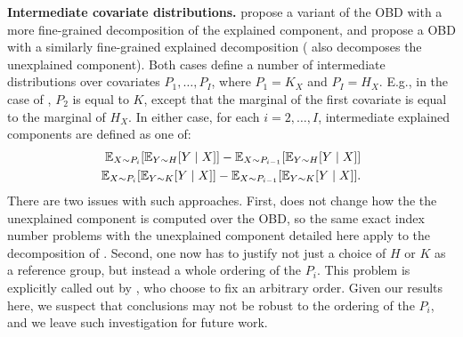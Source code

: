 \textbf{Intermediate covariate distributions.}
\citet{dinardoFortinLemieux1996} propose a variant of the OBD with a more fine-grained decomposition of the explained component, and \citet{quintero2025} propose a OBD with a similarly fine-grained explained decomposition (\citet{quintero2025} also decomposes the unexplained component).
Both cases define a number of intermediate distributions over covariates $P_1, \dots, P_I$, where $P_1 = K_X$ and $P_I = H_X$. E.g., in the case of \citet{quintero2025}, $P_2$ is equal to $K$, except that the marginal of the first covariate is equal to the marginal of $H_X$.
In either case, for each $i = 2, \dots, I$, intermediate explained components are defined as one of:
\begin{align}
  \mathbb{E}_{X \sim P_i}[ \mathbb{E}_{Y \sim H}[Y \mid X] ] - \mathbb{E}_{X \sim P_{i-1}} [ \mathbb{E}_{Y \sim H} [Y \mid X]] \\
  \mathbb{E}_{X \sim P_i}[ \mathbb{E}_{Y \sim K}[Y \mid X] ] - \mathbb{E}_{X \sim P_{i-1}} [ \mathbb{E}_{Y \sim K} [Y \mid X]].
\end{align}  
There are two issues with such approaches.
First, \citet{dinardoFortinLemieux1996} does not change how the the unexplained component is computed over the OBD, so the same exact index number problems with the unexplained component detailed here apply to the decomposition of \citet{dinardoFortinLemieux1996}.
Second, one now has to justify not just a choice of $H$ or $K$ as a reference group, but instead a whole ordering of the $P_i$.
This problem is explicitly called out by \citet{quintero2025}, who choose to fix an arbitrary order.
Given our results here, we suspect that conclusions may not be robust to the ordering of the $P_i$, and we leave such investigation for future work.
